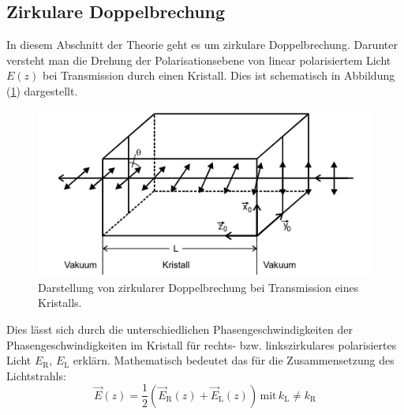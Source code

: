 \subsection{Zirkulare Doppelbrechung}
\label{sec:zirkulare_doppelbrechung}
In diesem Abschnitt der Theorie geht es um zirkulare Doppelbrechung. Darunter versteht man die Drehung der Polarisationsebene von linear polarisiertem Licht $E(z)$ bei Transmission durch einen Kristall.
Dies ist schematisch in Abbildung (\ref{fig:brechung}) dargestellt.
\begin{figure}
  \centering
  \includegraphics[scale=0.7]{fig/brechung.png}
  \caption{Darstellung von zirkularer Doppelbrechung bei Transmission eines Kristalls. \cite[1]{Anleitung}}
  \label{fig:brechung}
\end{figure}
Dies lässt sich durch die unterschiedlichen Phasengeschwindigkeiten der Phasengeschwindigkeiten im Kristall für rechts- bzw. linkszirkulares polarisiertes Licht $E_\mathrm{R}$, $E_\mathrm{L}$ erklärn. Mathematisch bedeutet das für
die Zusammensetzung des Lichtstrahls:
\begin{equation*}
  \label{eqn:zusammen}
  \vec{E}(z)=\dfrac{1}{2}(\vec{E}_\mathrm{R}(z)+\vec{E}_\mathrm{L}(z)) \, \mathrm{mit} \, k_\mathrm{L}\neq k_\mathrm{R}
\end{equation*}
